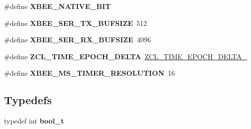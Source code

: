 \begin{DoxyCompactItemize}
\item 
\hypertarget{group__hal__win32_ga422c69254f74ee55358b35d9eba96602}{\#define {\bfseries X\-B\-E\-E\-\_\-\-N\-A\-T\-I\-V\-E\-\_\-B\-I\-T}}\label{group__hal__win32_ga422c69254f74ee55358b35d9eba96602}

\item 
\hypertarget{group__hal__win32_ga6037ea0df413fa8f86dff3a3d4988ea0}{\#define {\bfseries X\-B\-E\-E\-\_\-\-S\-E\-R\-\_\-\-T\-X\-\_\-\-B\-U\-F\-S\-I\-Z\-E}~512}\label{group__hal__win32_ga6037ea0df413fa8f86dff3a3d4988ea0}

\item 
\hypertarget{group__hal__win32_ga3b4b9c5fbbe3b3a824e4fa7aa7a77437}{\#define {\bfseries X\-B\-E\-E\-\_\-\-S\-E\-R\-\_\-\-R\-X\-\_\-\-B\-U\-F\-S\-I\-Z\-E}~4096}\label{group__hal__win32_ga3b4b9c5fbbe3b3a824e4fa7aa7a77437}

\item 
\hypertarget{group__hal__win32_ga503caf44f78cc52dc196c413cd6c78ab}{\#define {\bfseries Z\-C\-L\-\_\-\-T\-I\-M\-E\-\_\-\-E\-P\-O\-C\-H\-\_\-\-D\-E\-L\-T\-A}~\hyperlink{group__hal_ga735b0974380a73e9d7a12a1f199a5921}{Z\-C\-L\-\_\-\-T\-I\-M\-E\-\_\-\-E\-P\-O\-C\-H\-\_\-\-D\-E\-L\-T\-A\-\_}}\label{group__hal__win32_ga503caf44f78cc52dc196c413cd6c78ab}

\item 
\hypertarget{group__hal__win32_ga5cbeea4d9344138b657f78ad38813584}{\#define {\bfseries X\-B\-E\-E\-\_\-\-M\-S\-\_\-\-T\-I\-M\-E\-R\-\_\-\-R\-E\-S\-O\-L\-U\-T\-I\-O\-N}~16}\label{group__hal__win32_ga5cbeea4d9344138b657f78ad38813584}

\end{DoxyCompactItemize}
\subsection*{Typedefs}
\begin{DoxyCompactItemize}
\item 
\hypertarget{group__hal__win32_ga812d16e5494522586b3784e55d479912}{typedef int {\bfseries bool\-\_\-t}}\label{group__hal__win32_ga812d16e5494522586b3784e55d479912}

\end{DoxyCompactItemize}
